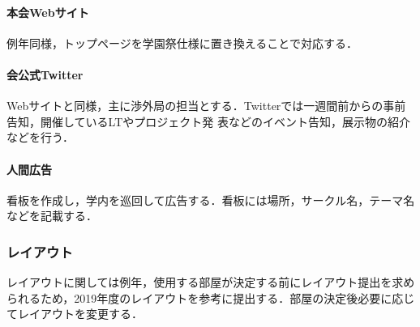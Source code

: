\paragraph{本会Webサイト}
例年同様，トップページを学園祭仕様に置き換えることで対応する．
\paragraph{会公式Twitter}
Webサイトと同様，主に渉外局の担当とする．Twitterでは一週間前からの事前告知，開催しているLTやプロジェクト発
表などのイベント告知，展示物の紹介などを行う．
\paragraph{人間広告}
看板を作成し，学内を巡回して広告する．看板には場所，サークル名，テーマ名などを記載する．
\subsubsection{レイアウト}
レイアウトに関しては例年，使用する部屋が決定する前にレイアウト提出を求められるため，2019年度のレイアウトを参考に提出する．部屋の決定後必要に応じてレイアウトを変更する．


